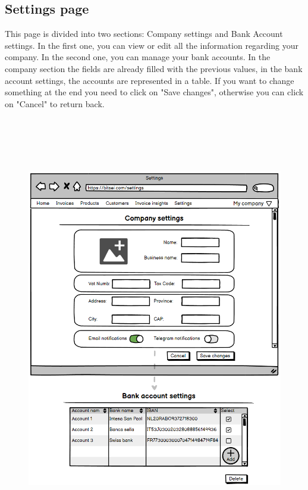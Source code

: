 \subsection{Settings page}
This page is divided into two sections: Company settings and Bank Account settings. In the first one, you can view or edit all the information regarding your company. In the second one, you can manage your bank accounts.
In the company section the fields are already filled with the previous values, in the bank account settings, the accounts are represented in a table.
If you want to change something at the end you need to click on "Save changes", otherwise you can click on "Cancel" to return back.
\begin{figure}[h!]
    \centering
    \includegraphics[height=530pt, keepaspectratio]{resources/mockup/Settings.png}
\end{figure}
